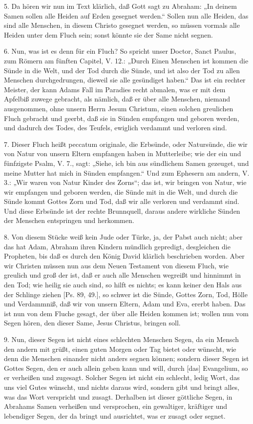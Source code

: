 5. Da hören wir nun im Text klärlich, daß Gott sagt zu Abraham: „In deinem Samen sollen alle Heiden auf Erden gesegnet werden.“ Sollen nun alle Heiden, das sind alle Menschen, in diesem Christo gesegnet werden, so müssen vormals alle Heiden unter dem Fluch sein; sonst könnte sie der Same nicht segnen.

6. Nun, was ist es denn für ein Fluch? So spricht unser Doctor, Sanct Paulus, zum Römern am fünften Capitel, V. 12.: „Durch Einen Menschen ist kommen die Sünde in die Welt, und der Tod durch die Sünde, und ist also der Tod zu allen Menschen durchgedrungen, dieweil sie alle gesündiget haben.“ Das ist ein rechter Meister, der kann Adams Fall im Paradies recht abmalen, was er mit dem Apfelbiß zuwege gebracht, als nämlich, daß er über alle Menschen, niemand ausgenommen, ohne unsern Herrn Jesum Christum, einen solchen greulichen Fluch gebracht und geerbt, daß sie in Sünden empfangen und geboren werden, und dadurch des Todes, des Teufels, ewiglich verdammt und verloren sind.

7. Dieser Fluch heißt peccatum originale, die Erbsünde, oder Natursünde, die wir von Natur von unsern Eltern empfangen haben in
Mutterleibe; wie der ein und fünfzigste Psalm, V. 7., sagt: „Siehe, ich bin aus sündlichem Samen gezeuget, und meine Mutter hat mich in Sünden empfangen.“ Und zum Ephesern am andern, V. 3.: „Wir waren von Natur Kinder des Zorns“; das ist, wir bringen von Natur, wie wir empfangen und geboren werden, die Sünde mit in die Welt, und durch die Sünde kommt Gottes Zorn und Tod, daß wir alle verloren und verdammt sind. Und diese Erbsünde ist der rechte Brunnquell, daraus andere wirkliche Sünden der Menschen entspringen und herkommen.

8. Von diesem Stücke weiß kein Jude oder Türke, ja, der Pabst auch nicht; aber das hat Adam, Abraham ihren Kindern mündlich gepredigt, desgleichen die Propheten, bis daß es durch den König David klärlich beschrieben worden. Aber wir Christen müssen nun aus dem Neuen Testament von diesem Fluch, wie greulich und groß der ist, daß er auch alle Menschen wegreißt und hinnimmt in den Tod; wie heilig sie auch sind, so hilft es nichts; es kann keiner den Hals aus der Schlinge ziehen [Ps. 89, 49.], so schwer ist die Sünde, Gottes Zorn, Tod, Hölle und Verdammniß, daß wir von unsern Eltern, Adam und Eva, ererbt haben. Das ist nun von dem Fluche gesagt, der über alle Heiden kommen ist; wollen nun vom Segen hören, den dieser Same, Jesus Christus, bringen soll.

9. Nun, dieser Segen ist nicht eines schlechten Menschen Segen, da ein Mensch den andern mit grüßt, einen guten Morgen oder Tag bietet oder wünscht, wie denn die Menschen einander nicht anders segnen können; sondern dieser Segen ist Gottes Segen, den er auch allein geben kann und will, durch [das] Evangelium, so er verheißen und zugesagt. Solcher Segen ist nicht ein schlecht, ledig Wort, das uns viel Gutes wünscht, und nichts daraus wird, sondern gibt und bringt alles, was das Wort verspricht und zusagt. Derhalben ist dieser göttliche Segen, in Abrahams Samen verheißen und versprochen, ein gewaltiger, kräftiger und lebendiger Segen, der da bringt und ausrichtet, was er zusagt oder segnet.

